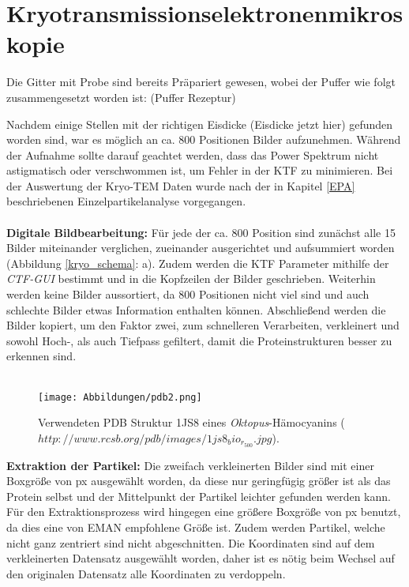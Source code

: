 \section{Kryotransmissionselektronenmikroskopie} %
\label{sec:kryopraeparation}

Die Gitter mit Probe sind bereits Präpariert gewesen, wobei der Puffer wie folgt zusammengesetzt worden ist:
(Puffer Rezeptur)

Nachdem einige Stellen mit der richtigen Eisdicke (Eisdicke jetzt hier) gefunden worden sind, war es möglich an ca. 800 Positionen Bilder aufzunehmen.
Während der Aufnahme sollte darauf geachtet werden, dass das Power Spektrum nicht astigmatisch oder verschwommen ist, um Fehler in der KTF zu minimieren.
Bei der Auswertung der Kryo-TEM Daten wurde nach der in Kapitel \ref{EPA} beschriebenen Einzelpartikelanalyse vorgegangen.
\\
\\
\textbf{Digitale Bildbearbeitung:}
Für jede der ca. 800 Position sind zunächst alle 15 Bilder miteinander verglichen, zueinander ausgerichtet und aufsummiert worden (Abbildung \ref{kryo_schema}: a).
Zudem werden die KTF Parameter mithilfe der \textit{CTF-GUI} bestimmt und in die Kopfzeilen der Bilder geschrieben.
Weiterhin werden keine Bilder aussortiert, da 800 Positionen nicht viel sind und auch schlechte Bilder etwas Information enthalten können.
Abschließend werden die Bilder kopiert, um den Faktor zwei, zum schnelleren Verarbeiten, verkleinert und sowohl Hoch-, als auch Tiefpass gefiltert, damit die Proteinstrukturen besser zu erkennen sind.
\\
\\
\begin{wrapfigure}{r}{0.2\textwidth}
	\centering
	\texttt{[image: Abbildungen/pdb2.png]}
	\caption[Darstellung der Oktopus Röntgenkristallstruktur]{Verwendeten PDB Struktur 1JS8 eines \textit{Oktopus}-Hämocyanins ($http://www.rcsb.org/pdb/images/1js8_bio_r_500.jpg$).}
	\label{octo}
\end{wrapfigure}
\textbf{Extraktion der Partikel:}
Die zweifach verkleinerten Bilder sind mit einer Boxgröße von \unit[196]{px} ausgewählt worden, da diese nur geringfügig größer ist als das Protein selbst und der Mittelpunkt der Partikel leichter gefunden werden kann.
Für den Extraktionsprozess wird hingegen eine größere Boxgröße von \unit[256]{px} benutzt, da dies eine von EMAN empfohlene Größe ist.
Zudem werden Partikel, welche nicht ganz zentriert sind nicht abgeschnitten.
Die Koordinaten sind auf dem verkleinerten Datensatz ausgewählt worden, daher ist es nötig beim Wechsel auf den originalen Datensatz alle Koordinaten zu verdoppeln.
